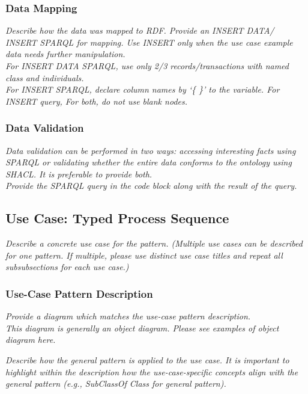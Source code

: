 
\subsubsection*{Data Mapping}
 \textit{ 
Describe how the data was mapped to RDF. Provide an INSERT DATA/ INSERT SPARQL for mapping. Use INSERT only when the use case example data needs further manipulation. \\
For INSERT DATA SPARQL, use only 2/3 records/transactions with named class and individuals. \\
For INSERT SPARQL, declare column names by `\{ \}' to the variable.  
For INSERT query, 
For both, do not use blank nodes.    
  }

\subsubsection*{Data Validation}
 \textit{ 
Data validation can be performed in two ways: accessing interesting facts using SPARQL or validating whether the entire data conforms to the ontology using SHACL. It is preferable to provide both. \\
Provide the SPARQL query in the code block along with the result of the query. \\
  }

\subsection*{Use Case: Typed Process Sequence}
 \textit{ 
Describe a concrete use case for the pattern. (Multiple use cases can be described for one pattern. If multiple, please use distinct use case titles and repeat all subsubsections for each use case.)
  }

\subsubsection*{Use-Case Pattern Description}
 \textit{ 
Provide a diagram which matches the use-case pattern description. \\
\noindent \textit{This diagram is generally an object diagram. Please see examples of object diagram here.}
  }

 \textit{ 
Describe how the general pattern is applied to the use case. It is important to highlight within the description how the use-case-specific concepts align with the general pattern (e.g., SubClassOf Class for general pattern).
  }

